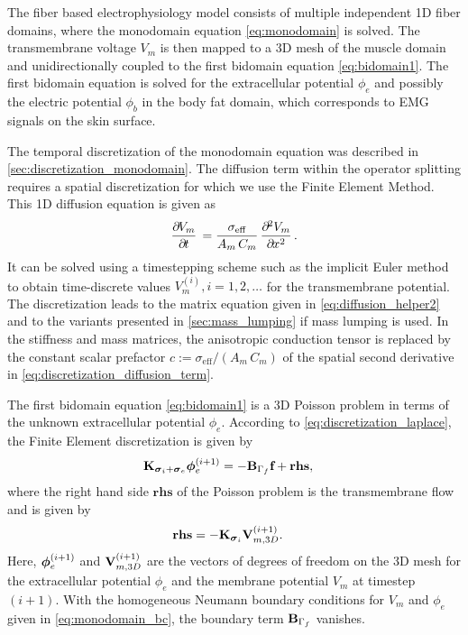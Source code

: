 The fiber based electrophysiology model consists of multiple independent 1D fiber domains, where the monodomain equation \cref{eq:monodomain} is solved. The transmembrane voltage $V_m$ is then mapped to a 3D mesh of the muscle domain and unidirectionally coupled to the first bidomain equation \cref{eq:bidomain1}. The first bidomain equation is solved for the extracellular potential $\phi_e$ and possibly the electric potential $\phi_b$ in the body fat domain, which corresponds to EMG signals on the skin surface.

The temporal discretization of the monodomain equation was described in \cref{sec:discretization_monodomain}. The diffusion term within the operator splitting requires a spatial discretization for which we use the Finite Element Method. This 1D diffusion equation is given as
\begin{align}\label{eq:discretization_diffusion_term}
  \p{V_m}{t} = \dfrac{\sigma_\text{eff}}{A_m\,C_m} \p{V_m}{x}{2}.
\end{align}
It can be solved using a timestepping scheme such as the implicit Euler method to obtain time-discrete values $V_m^{(i)}, i=1,2,\dots$ for the transmembrane potential. The discretization leads to the matrix equation given in \cref{eq:diffusion_helper2} and to the variants presented in \cref{sec:mass_lumping} if mass lumping is used. In the stiffness and mass matrices, the anisotropic conduction tensor is replaced by the constant scalar prefactor $c := \sigma_\text{eff}/(A_m\,C_m)$ of the spatial second derivative in \cref{eq:discretization_diffusion_term}.

The first bidomain equation \cref{eq:bidomain1} is a 3D Poisson problem in terms of the unknown extracellular potential $\phi_e$. According to \cref{eq:discretization_laplace}, the Finite Element discretization is given by%
\begin{align*}
  \textbf{K}_{\boldsymbol{\sigma}_i + \boldsymbol{\sigma}_e} \boldsymbol{\phi}_e^{(i+1)} &= - \textbf{B}_{\Gamma_f}\textbf{f} + \textbf{rhs},
\end{align*}
where the right hand side $\textbf{rhs}$ of the Poisson problem is the transmembrane flow and is given by
\begin{align}\label{eq:static_bidomain_rhs}
  \textbf{rhs} &= -\textbf{K}_{\boldsymbol{\sigma}_i} \textbf{V}_{m,3D}^{(i+1)}.
\end{align}
Here, $\boldsymbol{\phi}_e^{(i+1)}$ and $\textbf{V}_{m,3D}^{(i+1)}$ are the vectors of degrees of freedom on the 3D mesh for the extracellular potential $\phi_e$ and the membrane potential $V_m$ at timestep $(i+1)$. With the homogeneous Neumann boundary conditions for $V_m$ and $\phi_e$ given in \cref{eq:monodomain_bc}, the boundary term $\textbf{B}_{\Gamma_f}$ vanishes.

